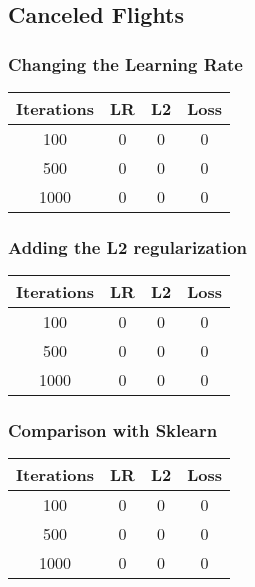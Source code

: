 \documentclass[
	letterpaper, %
	10pt, %
]{class}
\begin{document}
\subsection{Canceled Flights}

\subsubsection{Changing the Learning Rate}

\begin{center}
	\begin{tabular}{ |c|c|c|c| }
		\hline
		Iterations & LR & L2 & Loss \\
		\hline
		100        & 0  & 0  & 0    \\
		500        & 0  & 0  & 0    \\
		1000       & 0  & 0  & 0    \\
		\hline
	\end{tabular}
\end{center}

\subsubsection{Adding the L2 regularization}

\begin{center}
	\begin{tabular}{ |c|c|c|c| }
		\hline
		Iterations & LR & L2 & Loss \\
		\hline
		100        & 0  & 0  & 0    \\
		500        & 0  & 0  & 0    \\
		1000       & 0  & 0  & 0    \\
		\hline
	\end{tabular}
\end{center}

\subsubsection{Comparison with Sklearn}

\begin{center}
	\begin{tabular}{ |c|c|c|c| }
		\hline
		Iterations & LR & L2 & Loss \\
		\hline
		100        & 0  & 0  & 0    \\
		500        & 0  & 0  & 0    \\
		1000       & 0  & 0  & 0    \\
		\hline
	\end{tabular}
\end{center}
\end{document}
